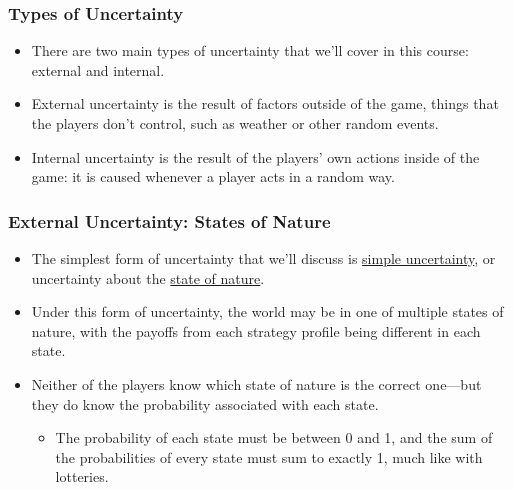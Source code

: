 \begin{frame}
\frametitle{Types of Uncertainty}
\begin{itemize}
	\item There are two main types of uncertainty that we'll cover in this course: \alert{external} and \alert{internal}.
	\item External uncertainty is the result of factors outside of the game, things that the players don't control, such as weather or other random events.
	\item Internal uncertainty is the result of the players' own actions inside of the game: it is caused whenever a player acts in a random way.
\end{itemize}
\end{frame}


\begin{frame}
\frametitle{External Uncertainty: States of Nature}
\begin{itemize}
\item The simplest form of uncertainty that we'll discuss is \underline{simple uncertainty}, or uncertainty about the \underline{state of nature}.
\item Under this form of uncertainty, the world may be in one of multiple states of nature, with the payoffs from each strategy profile being different in each state. 
\item Neither of the players know which state of nature is the correct one---but they do know the probability associated with each state.
\begin{itemize}
	\item The probability of each state must be between 0 and 1, and the sum of the probabilities of every state must sum to exactly 1, much like with lotteries.
\end{itemize}
\end{itemize}
\end{frame}



